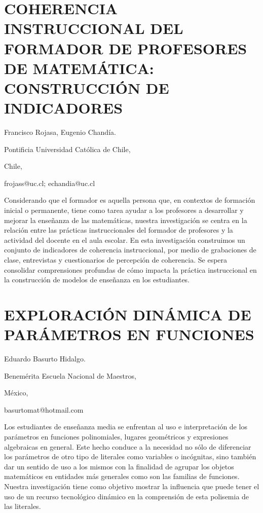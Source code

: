 \section{COHERENCIA INSTRUCCIONAL DEL FORMADOR DE PROFESORES DE MATEMÁTICA:
CONSTRUCCIÓN DE INDICADORES}

\begin{datos}

Francisco Rojasa, Eugenio Chandía.

Pontificia Universidad Católica de Chile,

Chile,

frojass@uc.cl; echandia@uc.cl

\end{datos}

Considerando que el formador es aquella persona que, en contextos
de formación inicial o permanente, tiene como tarea ayudar a los profesores
a desarrollar y mejorar la enseñanza de las matemáticas, nuestra investigación
se centra en la relación entre las prácticas instruccionales del formador
de profesores y la actividad del docente en el aula escolar. En esta
investigación construimos un conjunto de indicadores de coherencia
instruccional, por medio de grabaciones de clase, entrevistas y cuestionarios
de percepción de coherencia. Se espera consolidar comprensiones profundas
de cómo impacta la práctica instruccional en la construcción de modelos
de enseñanza en los estudiantes.


\section{EXPLORACIÓN DINÁMICA DE PARÁMETROS EN FUNCIONES}

\begin{datos}

Eduardo Basurto Hidalgo.

Benemérita Escuela Nacional de Maestros,

México,

basurtomat@hotmail.com

\end{datos}

Los estudiantes de enseñanza media se enfrentan al uso e interpretación
de los parámetros en funciones polinomiales, lugares geométricos y
expresiones algebraicas en general. Este hecho conduce a la necesidad
no sólo de diferenciar los parámetros de otro tipo de literales como
variables o incógnitas, sino también dar un sentido de uso a los mismos
con la finalidad de agrupar los objetos matemáticos en entidades más
generales como son las familias de funciones. Nuestra investigación
tiene como objetivo mostrar la influencia que puede tener el uso de
un recurso tecnológico dinámico en la comprensión de esta polisemia
de las literales.


